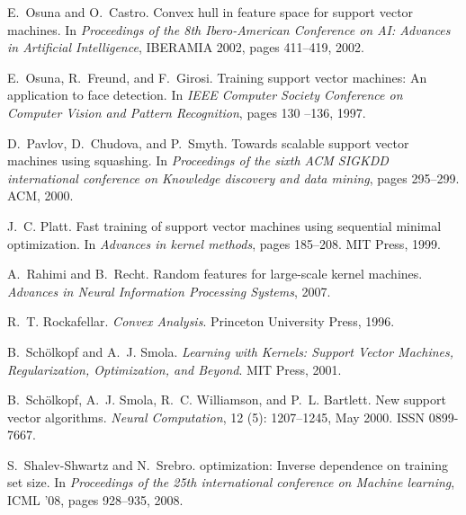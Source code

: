 \documentclass[twoside]{article}
\begin{document}
\begin{thebibliography}{45}
E.~Osuna and O.~Castro.
\newblock Convex hull in feature space for support vector machines.
\newblock In \emph{Proceedings of the 8th Ibero-American Conference on {AI}:
  Advances in Artificial Intelligence}, IBERAMIA 2002, pages 411--419, 2002.

E.~Osuna, R.~Freund, and F.~Girosi.
\newblock Training support vector machines: {A}n application to face detection.
\newblock In \emph{IEEE Computer Society Conference on Computer Vision and
  Pattern Recognition}, pages 130 --136, 1997.

D.~Pavlov, D.~Chudova, and P.~Smyth.
\newblock Towards scalable support vector machines using squashing.
\newblock In \emph{Proceedings of the sixth ACM SIGKDD international conference
  on Knowledge discovery and data mining}, pages 295--299. ACM, 2000.

J.~C. Platt.
\newblock Fast training of support vector machines using sequential minimal
  optimization.
\newblock In \emph{Advances in kernel methods}, pages 185--208. MIT Press,
  1999.

A.~Rahimi and B.~Recht.
\newblock Random features for large-scale kernel machines.
\newblock \emph{Advances in Neural Information Processing Systems}, 2007.

R.~T. Rockafellar.
\newblock \emph{Convex Analysis}.
\newblock Princeton University Press, 1996.

B.~Sch\"{o}lkopf and A.~J. Smola.
\newblock \emph{Learning with Kernels: {S}upport Vector Machines,
  Regularization, Optimization, and Beyond}.
\newblock MIT Press, 2001.

B.~Sch\"{o}lkopf, A.~J. Smola, R.~C. Williamson, and P.~L. Bartlett.
\newblock New support vector algorithms.
\newblock \emph{Neural Computation}, 12 (5): 1207--1245, May
  2000.
\newblock ISSN 0899-7667.

S.~Shalev-Shwartz and N.~Srebro.
 optimization: {I}nverse dependence on training set size.
\newblock In \emph{Proceedings of the 25th international conference on Machine
  learning}, ICML '08, pages 928--935, 2008.


\end{thebibliography}
\end{document}
